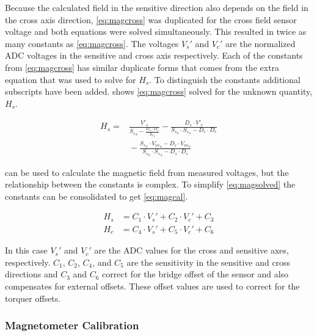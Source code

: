 Because the calculated field in the sensitive direction also depends on the field in the cross axis direction, \cref{eq:magcross} was duplicated for the cross field sensor voltage and both equations were solved simultaneously. This resulted in twice as many constants as \cref{eq:magcross}. The voltages $V_s'$ and $V_c'$ are the normalized \ac{ADC} voltages in the sensitive and cross axis respectively. Each of the constants from \cref{eq:magcross} has similar duplicate forms that comes from the extra equation that was used to solve for $H_s$. To distinguish the constants additional subscripts have been added.  shows \cref{eq:magcross} solved for the unknown quantity, $H_s$.

\begin{equation}
    \begin{split}
    H_s = & \frac{V'_s }{{S_s}_s - \frac{D_s \cdot D_c}{{S_s}_c}} - \frac{D_s \cdot  V'_c }{{S_s}_c \cdot {S_s}_s - D_s \cdot D_c}\\
    & {}- \frac{{S_s}_c \cdot {V_{os}}_s  -D_s \cdot {V_{os}}_c}{{S_s}_c \cdot {S_s}_s - D_s \cdot D_c}
    \end{split}
    \label{eq:magsolved} 
\end{equation}

 can be used to calculate the magnetic field from measured voltages, but the relationship between the constants is complex. To simplify \cref{eq:magsolved} the constants can be consolidated to get \cref{eq:magcal}.

\begin{equation}
    \label{eq:magcal}
    \begin{split}
        H_s &= C_1 \cdot V_s' + C_2 \cdot V_c' + C_3\\
        H_c &= C_4 \cdot V_s' + C_5 \cdot V_c' + C_6
    \end{split}
\end{equation}

In this case $V_s'$ and $V_c'$ are the \ac{ADC} values for the cross and sensitive axes, respectively. $C_1$, $C_2$, $C_4$, and $C_5$ are the sensitivity in the sensitive and cross directions and $C_3$ and $C_6$ correct for the bridge offset of the sensor and also compensates for external offsets. These offset values are used to correct for the torquer offsets.

\subsubsection{Magnetometer Calibration}
\label{sec:magcal}

